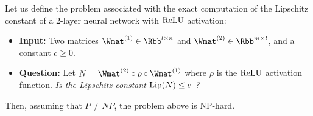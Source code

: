 \begin{theorem} \label{theorem:ch3-lipschitz_computation}
  Let us define the problem associated with the exact computation of the Lipschitz constant of a $2$-layer neural network with $\mathrm{ReLU}$ activation:
  \begin{itemize}%
    \item[] \textbf{Input:} Two matrices $\Wmat^{(1)} \in \Rbb^{l \times n}$ and $\Wmat^{(2)} \in \Rbb^{m \times l}$, and a constant $c \geq 0$.
    \item[] \textbf{Question:} Let $N = \Wmat^{(2)} \circ \rho \circ \Wmat^{(1)}$ where $\rho$ is the $\mathrm{ReLU}$ activation function. \emph{Is the Lipschitz constant $\lip{N} \leq c$ ?}
  \end{itemize}
  Then, assuming that $P \neq NP$, the problem above is NP-hard. 
\end{theorem}



